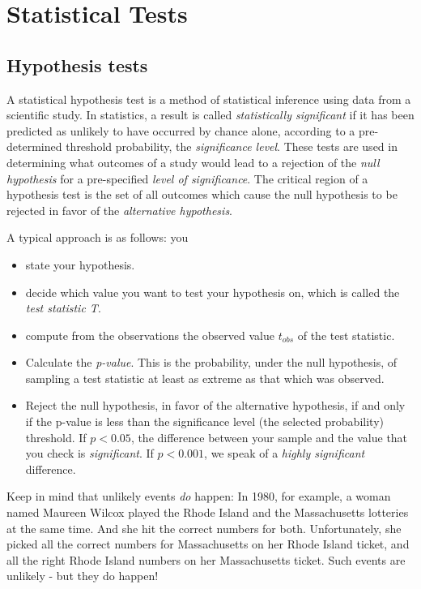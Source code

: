 \chapter{Statistical Tests}

\section{Hypothesis tests}\label{sec:hypotheses} 

A statistical hypothesis test is a method of statistical inference using data from a scientific study. In statistics, a result is called \emph{statistically significant} if it has been predicted as unlikely to have occurred by chance alone, according to a pre-determined threshold probability, the \emph{significance level}. These tests are used in determining what outcomes of a study would lead to a rejection of the \emph{null hypothesis} for a pre-specified \emph{level of significance}. The critical region of a hypothesis test is the set of all outcomes which cause the null hypothesis to be rejected in favor of the \emph{alternative hypothesis}.

A typical approach is as follows: you

\begin{itemize}
  \item   state your hypothesis.
  \item   decide which value you want to test your hypothesis on, which is called the \emph{test statistic T}.
  \item   compute from the observations the observed value $t_{obs}$ of the test statistic.
  \item   Calculate the \emph{p-value}. This is the probability, under the null hypothesis, of sampling a test statistic at least as extreme as that which was observed.
  \item   Reject the null hypothesis, in favor of the alternative hypothesis, if and only if the p-value is less than the significance level (the selected probability) threshold. If $p<0.05$, the difference between your sample and the value that you check is \emph{significant}. If $p<0.001$, we speak of a \emph{highly significant} difference.
\end{itemize}

Keep in mind that unlikely events \emph{do} happen: In 1980, for example, a woman named Maureen Wilcox played the Rhode Island and the Massachusetts lotteries at the same time. And she hit the correct numbers for both. Unfortunately, she picked all the correct numbers for Massachusetts on her Rhode Island ticket, and all the right Rhode Island numbers on her Massachusetts ticket. Such events are unlikely - but they do happen!


